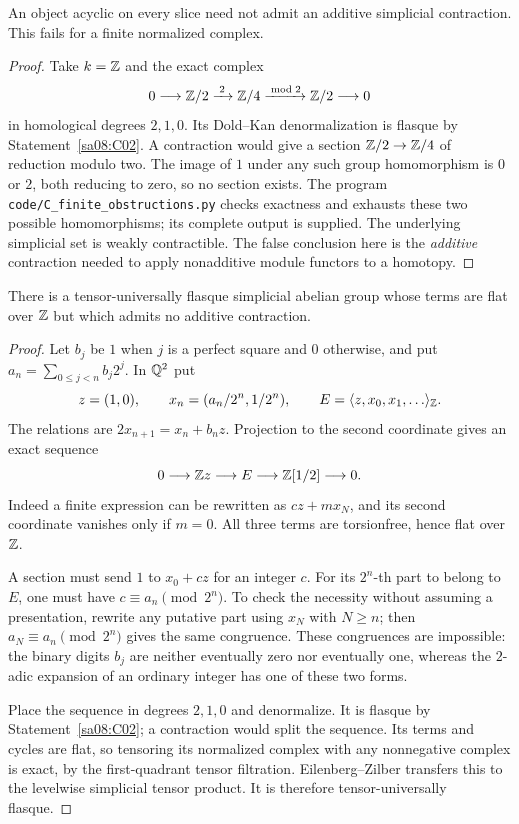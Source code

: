 \begin{proposition}\label{sa08:C03}
An object acyclic on every slice need not admit an additive simplicial
contraction. This fails for a finite normalized complex.
\end{proposition}
\begin{proof}
Take $k=\mathbb Z$ and the exact complex
\[
 0\longrightarrow\mathbb Z/2\xrightarrow{\;2\;}\mathbb Z/4
 \xrightarrow{\bmod2}\mathbb Z/2\longrightarrow0
\]
in homological degrees $2,1,0$. Its Dold--Kan denormalization is
flasque by Statement~\ref{sa08:C02}. A contraction would give a
section $\mathbb Z/2\to\mathbb Z/4$ of reduction modulo two. The image of $1$
under any such group homomorphism is $0$ or $2$, both reducing to
zero, so no section exists. The program
\texttt{code/C\_finite\_obstructions.py} checks exactness and exhausts
these two possible homomorphisms; its complete output is supplied.
The underlying simplicial set is weakly contractible. The false
conclusion here is the \emph{additive} contraction needed to apply
nonadditive module functors to a homotopy.
\end{proof}

\begin{proposition}\label{sa08:C04}
There is a tensor-universally flasque simplicial abelian group whose
terms are flat over $\mathbb Z$ but which admits no additive contraction.
\end{proposition}
\begin{proof}
Let $b_j$ be $1$ when $j$ is a perfect square and $0$ otherwise, and put
$a_n=\sum_{0\le j<n}b_j2^j$. In $\mathbb Q^2$ put
\[
 z=(1,0),\qquad x_n=(a_n/2^n,1/2^n),\qquad
 E=\langle z,x_0,x_1,\ldots\rangle_{\mathbb Z}.
\]
The relations are $2x_{n+1}=x_n+b_nz$. Projection to the second
coordinate gives an exact sequence
\[
 0\longrightarrow\mathbb Z z\longrightarrow E\longrightarrow\mathbb Z[1/2]
 \longrightarrow0.
\]
Indeed a finite expression can be rewritten as $cz+mx_N$, and its
second coordinate vanishes only if $m=0$. All three terms are
torsionfree, hence flat over $\mathbb Z$.

A section must send $1$ to $x_0+cz$ for an integer $c$. For its
$2^n$-th part to belong to $E$, one must have
$c\equiv a_n\pmod{2^n}$. To check the necessity without assuming a
presentation, rewrite any putative part using $x_N$ with $N\ge n$;
then $a_N\equiv a_n\pmod{2^n}$ gives the same congruence. These
congruences are impossible: the binary digits $b_j$ are neither
eventually zero nor eventually one, whereas the $2$-adic expansion
of an ordinary integer has one of these two forms.

Place the sequence in degrees $2,1,0$ and denormalize. It is flasque
by Statement~\ref{sa08:C02}; a contraction would split the sequence.
Its terms and cycles are flat, so tensoring its normalized complex
with any nonnegative complex is exact, by the first-quadrant tensor
filtration. Eilenberg--Zilber transfers this to the levelwise
simplicial tensor product. It is therefore tensor-universally flasque.
\end{proof}

